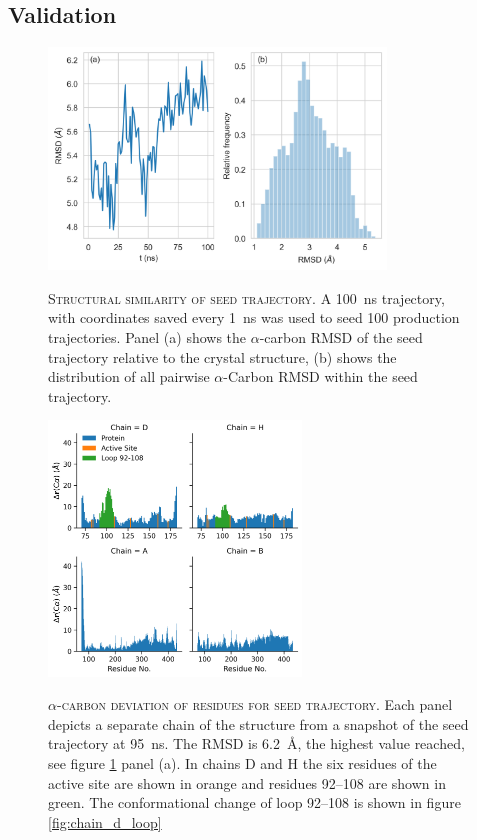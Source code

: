 \subsection{Validation}\label{sec:aadh_validation}

\begin{figure}
    \centering
    \caption[Structural similarity of seed trajectory]{\textsc{Structural similarity of seed trajectory}. A \SI{100}{\nano\second} trajectory, with coordinates saved every \SI{1}{\nano\second} was used to seed \num{100} production trajectories.  Panel (a) shows the $\alpha$-carbon RMSD of the seed trajectory relative to the crystal structure, (b) shows the distribution of all pairwise $\alpha$-Carbon RMSD within the seed trajectory. }
    \includegraphics[width=0.8\textwidth]{chapters/aadh/figures/rmsd_seed_trajectory.png}
    \label{fig:rmsd_seed_traj}
\end{figure}
\begin{figure}
    \centering
    \caption[alpha-carbon deviation of residues from the seed trajectory]{\textsc{$\alpha$-carbon deviation of residues for seed trajectory}. Each panel depicts a separate chain of the structure from a snapshot of the seed trajectory at \SI{95}{\nano\second}. The RMSD is \SI{6.2}{\angstrom}, the highest value reached, see figure \ref{fig:rmsd_seed_traj} panel (a). In chains D and H the six residues of the active site are shown in orange and residues \numrange[range-phrase=\text{--}]{92}{108} are shown in green. The conformational change of loop \numrange[range-phrase=\text{--}]{92}{108} is shown in figure \ref{fig:chain_d_loop}}
    \includegraphics[width=0.6\textwidth]{chapters/aadh/figures/rmsd_by_res.png}
    \label{fig:aadh_rmsd_byres}
\end{figure}

